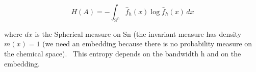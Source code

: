 \[ H(A) = -\int_\mathbb{{S}^n}  \hat{f}_h(x)\log  \hat{f}_h(x) \,dx  \]



where $dx$ is the Spherical measure on Sn (the invariant measure has density $m(x)=1$ (we need an embedding because there is no probability measure on the chemical space). 
This entropy depends on the bandwidth h and on the embedding.
